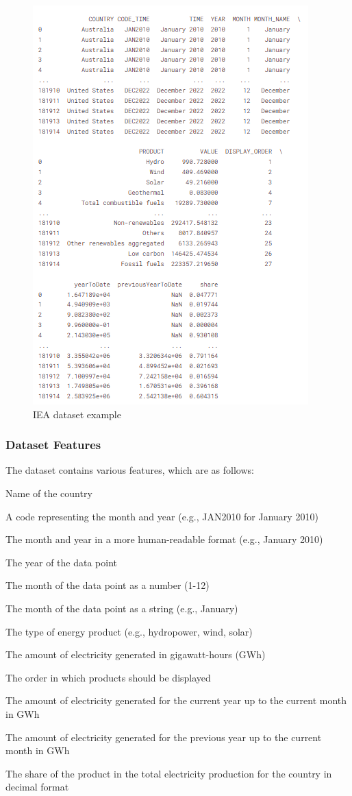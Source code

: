 \documentclass[12pt]{article}
\begin{document}
\begin{figure}[h]
    \centering
    \includegraphics[width=0.5\linewidth]{IEA.png}
    \caption{IEA dataset example}
    \label{fig:Fig2}
\end{figure}

\subsubsection{Dataset Features}
The dataset contains various features, which are as follows:

\begin{description}[left=0pt, labelwidth=2.5cm, labelsep=1em, font=\normalfont]
    \item[\textbf{COUNTRY:}] Name of the country
    \item[\textbf{CODE\_TIME:}] A code representing the month and year (e.g., JAN2010 for January 2010)
    \item[\textbf{TIME:}] The month and year in a more human-readable format (e.g., January 2010)
    \item[\textbf{YEAR:}] The year of the data point
    \item[\textbf{MONTH:}] The month of the data point as a number (1-12)
    \item[\textbf{MONTH\_NAME:}] The month of the data point as a string (e.g., January)
    \item[\textbf{PRODUCT:}] The type of energy product (e.g., hydropower, wind, solar)
    \item[\textbf{VALUE:}] The amount of electricity generated in gigawatt-hours (GWh)
    \item[\textbf{DISPLAY\_ORDER:}] The order in which products should be displayed
    \item[\textbf{yearToDate:}] The amount of electricity generated for the current year up to the current month in GWh
    \item[\textbf{previousYearToDate:}] The amount of electricity generated for the previous year up to the current month in GWh
    \item[\textbf{share:}] The share of the product in the total electricity production for the country in decimal format
\end{description}
\end{document}
